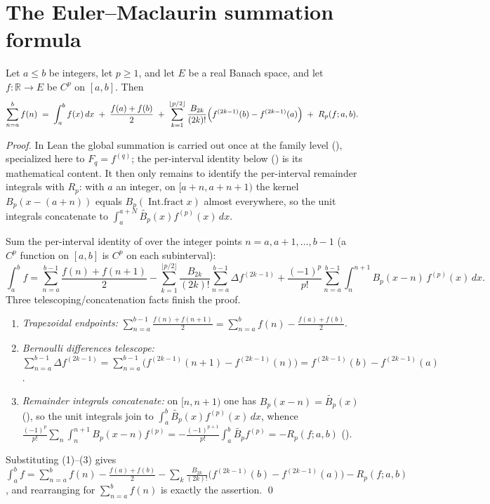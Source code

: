 \section{The Euler--Maclaurin summation formula}
\label{sec:em_main}

\begin{theorem}
\label{thm:euler_maclaurin}
\leanok
{}
Let $a \le b$ be integers, let $p \ge 1$, and let $E$ be a real Banach space, and let
$f : \mathbb{R} \to E$ be $C^p$ on $[a,b]$. Then
\[
  \sum_{n=a}^{b} f(n)
  \;=\; \int_a^b f(x)\,dx
      \;+\; \frac{f(a)+f(b)}{2}
      \;+\; \sum_{k=1}^{\lfloor p/2\rfloor} \frac{B_{2k}}{(2k)!}\Bigl(f^{(2k-1)}(b) - f^{(2k-1)}(a)\Bigr)
      \;+\; R_p(f; a, b).
\]
\end{theorem}

\begin{proof}
\leanok
{}
In Lean the global summation is carried out once at the family level
(), specialized here to $F_q = f^{(q)}$; the per-interval
identity below () is its mathematical content. It then only
remains to identify the per-interval remainder integrals with $R_p$: with $a$ an
integer, on $[a+n,a+n+1)$ the kernel $B_p(x-(a+n))$ equals $B_p(\operatorname{Int.fract} x)$
almost everywhere, so the unit integrals concatenate to
$\int_a^{a+N} \widetilde{B_p}(x) f^{(p)}(x)\,dx$.

Sum the per-interval identity of  over the integer points
$n = a, a+1, \dots, b-1$ (a $C^p$ function on $[a,b]$ is $C^p$ on each subinterval):
\[
  \int_a^b f
  = \sum_{n=a}^{b-1}\frac{f(n)+f(n+1)}{2}
    - \sum_{k=1}^{\lfloor p/2\rfloor}\frac{B_{2k}}{(2k)!}\sum_{n=a}^{b-1}\Delta f^{(2k-1)}
    + \frac{(-1)^p}{p!}\sum_{n=a}^{b-1}\int_n^{n+1} B_p(x-n)\,f^{(p)}(x)\,dx .
\]
Three telescoping/concatenation facts finish the proof.
\begin{enumerate}
\item \emph{Trapezoidal endpoints:}
  $\sum_{n=a}^{b-1}\frac{f(n)+f(n+1)}{2} = \sum_{n=a}^{b} f(n) - \frac{f(a)+f(b)}{2}$.
\item \emph{Bernoulli differences telescope:}
  $\sum_{n=a}^{b-1}\Delta f^{(2k-1)} = \sum_{n=a}^{b-1}\bigl(f^{(2k-1)}(n+1)-f^{(2k-1)}(n)\bigr)
   = f^{(2k-1)}(b)-f^{(2k-1)}(a)$.
\item \emph{Remainder integrals concatenate:} on $[n,n+1)$ one has
  $B_p(x-n) = \widetilde{B_p}(x)$ (), so the unit
  integrals join to $\int_a^b \widetilde{B_p}(x) f^{(p)}(x)\,dx$, whence
  $\frac{(-1)^p}{p!}\sum_n \int_n^{n+1}B_p(x-n)f^{(p)}
  = -\frac{(-1)^{p+1}}{p!}\int_a^b \widetilde{B_p}f^{(p)} = -R_p(f;a,b)$
  ().
\end{enumerate}
Substituting (1)--(3) gives
$\int_a^b f = \sum_{n=a}^b f(n) - \frac{f(a)+f(b)}{2}
 - \sum_{k}\frac{B_{2k}}{(2k)!}\bigl(f^{(2k-1)}(b)-f^{(2k-1)}(a)\bigr) - R_p(f;a,b)$,
and rearranging for $\sum_{n=a}^b f(n)$ is exactly the assertion. \qed
\end{proof}

